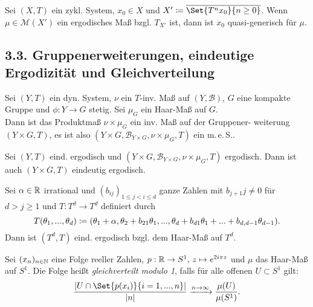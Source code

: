 \documentclass{cheat-sheet}
\newcommand{\clos}[1]{\overline{#1}} %
\newcommand{\Bor}{\mathcal{B}} %
\newcommand{\meS}{m.\,e.\,S.} %
\begin{document}
\begin{prop}
  Sei $(X, T)$ ein zykl. System, $x_0 \!\in\! X$ und $X' \coloneqq \clos{\Set{T^n x_0}{n \geq 0}}$. Wenn $\mu \in \mathcal{M}(X')$ ein ergodisches Maß bzgl. $T_{X'}$ ist, dann ist $x_0$ quasi-generisch für $\mu$.
\end{prop}

\begin{samepage}
  \section{3.3. Gruppenerweiterungen, eindeutige Ergodizität und Gleichverteilung}
\end{samepage}

\begin{defn}
  Sei $(Y, T)$ ein dyn. System, $\nu$ ein $T$-inv. Maß auf $(Y, \Bor)$, $G$ eine kompakte Gruppe und $\phi : Y \!\to\! G$ stetig.
  Sei $\mu_G$ ein Haar-Maß auf $G$. \\
  Dann ist das Produktmaß $\nu \!\times\! \mu_G$ ein inv. Maß auf der Gruppener- weiterung $(Y \!\times\! G, T)$, es ist also $(Y \!\times\! G, \Bor_{Y \times G}, \nu \!\times\! \mu_G, T)$ ein \meS{}.
\end{defn}

\begin{prop}
  Sei $(Y, T)$ eind. ergodisch und $(Y \!\times\! G, \Bor_{Y \times G}, \nu \!\times\! \mu_G, T)$ ergodisch. Dann ist auch $(Y \!\times\! G, T)$ eindeutig ergodisch.
\end{prop}


\begin{prop}
  Sei $\alpha \in \mathbb{R}$ irrational und $(b_{ij})_{1 \leq j < i \leq d}$ ganze Zahlen mit $b_{j+1}{j} \neq 0$ für $d > j \geq 1$ und $T : T^d \to T^d$ definiert durch
  \[
    T(\theta_1, ..., \theta_d) \coloneqq (\theta_1 + \alpha, \theta_2 + b_{21} \theta_1, ..., \theta_d + b_{d1} \theta_1 + ... + b_{d,d-1} \theta_{d-1}).
  \]
  Dann ist $(T^d, T)$ eind. ergodisch bzgl. dem Haar-Maß auf $T^d$.
\end{prop}

\begin{defn}
  Sei $(x_n)_{n \in \mathbb{N}}$ eine Folge reeller Zahlen, $p : \mathbb{R} \to S^1, \, z \mapsto e^{2i\pi z}$ und $\mu$ das Haar-Maß auf $S^1$.
  Die Folge heißt \emph{gleichverteilt modulo 1}, falls für alle offenen $U \subset S^1$ gilt:
  \[ \frac{\abs{U \cap \Set{p(x_i)}{i=1,\nldots,n}}}{\abs{n}} \xrightarrow{n \to \infty} \frac{\mu(U)}{\mu(S^1)}. \]
\end{defn}
\end{document}
